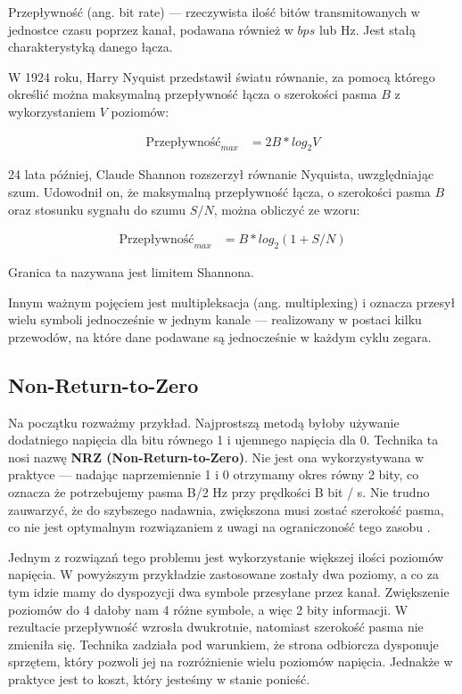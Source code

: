 Przepływność (ang. bit rate) --- rzeczywista ilość bitów transmitowanych w jednostce czasu poprzez kanał, podawana również w $bps$ lub Hz. Jest stałą charakterystyką danego łącza.

W 1924 roku, Harry Nyquist przedstawił światu równanie, za pomocą którego określić można maksymalną przepływność łącza o szerokości pasma $B$ z wykorzystaniem $V$ poziomów:

\begin{align*}
    \text{Przepływność}_{max} &= 2B * log_{2}{V}
\end{align*}

24 lata później, Claude Shannon rozszerzył równanie Nyquista, uwzględniając szum. Udowodnił on, że maksymalną przepływność łącza, o szerokości pasma $B$ oraz stosunku sygnału do szumu $S/N$, można
obliczyć ze wzoru:

\begin{align*}
    \text{Przepływność}_{max} &= B * log_{2}{(1 + S/N)}
\end{align*}

Granica ta nazywana jest limitem Shannona.

Innym ważnym pojęciem jest multipleksacja (ang. multiplexing) i oznacza przesył wielu symboli jednocześnie w jednym kanale --- realizowany w postaci kilku przewodów, na które dane podawane są jednocześnie w każdym cyklu zegara.

\subsection{Non-Return-to-Zero}

Na początku rozważmy przykład. Najprostszą metodą byłoby używanie dodatniego napięcia dla bitu równego 1 i ujemnego napięcia dla 0.
Technika ta nosi nazwę \textbf{NRZ (Non-Return-to-Zero)}. Nie jest ona wykorzystywana w praktyce --- nadając naprzemiennie 1 i 0 otrzymamy okres równy 2 bity, co oznacza że potrzebujemy pasma B/2 Hz przy prędkości B bit / s.
Nie trudno zauwarzyć, że do szybszego nadawnia, zwiększona musi zostać szerokość pasma, co nie jest optymalnym rozwiązaniem z uwagi na ograniczoność tego zasobu \cite{Computer-networks-Tanenbaum}.

Jednym z rozwiązań tego problemu jest wykorzystanie większej ilości poziomów napięcia. W powyższym przykładzie zastosowane zostały dwa poziomy, a co za tym idzie mamy do dyspozycji dwa symbole przesyłane przez kanał.
Zwiększenie poziomów do 4 dałoby nam 4 różne symbole, a więc 2 bity informacji. W rezultacie przepływność wzrosła dwukrotnie, natomiast szerokość pasma nie zmieniła się. Technika zadziała pod warunkiem, że strona odbiorcza dysponuje sprzętem, który pozwoli jej na
rozróżnienie wielu poziomów napięcia. Jednakże w praktyce jest to koszt, który jesteśmy w stanie ponieść.

